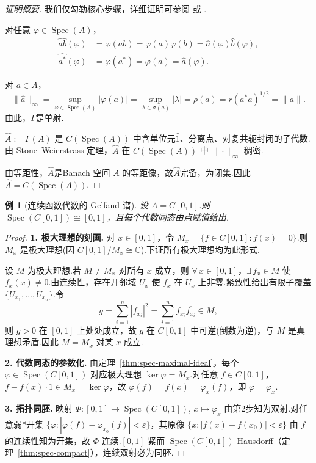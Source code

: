 \documentclass{ctexart}
\newtheorem{example}{例}[section]
\theoremstyle{plain}
\newtheorem*{proof}{证明}
\theoremstyle{plain}
\DeclareMathOperator{\Spec}{Spec}
\begin{document}
\begin{proof}[证明概要]
    我们仅勾勒核心步骤，详细证明可参阅 \cite{Murphy} 或 \cite{Davidson}.\par
     对任意 $\varphi \in \Spec(A)$，
    \begin{align}
        \widehat{ab}(\varphi) &= \varphi(ab) = \varphi(a)\varphi(b) = \widehat{a}(\varphi)\widehat{b}(\varphi), \\
        \widehat{a^*}(\varphi) &= \varphi(a^*) = \overline{\varphi(a)} = \overline{\widehat{a}(\varphi)}.
    \end{align}

     对 $a \in A$，
    \begin{equation}
        \|\widehat{a}\|_\infty = \sup_{\varphi \in \Spec(A)} |\varphi(a)| = \sup_{\lambda \in \sigma(a)} |\lambda| = \rho(a)= r(a^*a)^{1/2} = \|a\|.
    \end{equation}
    由此，$\Gamma$是单射.\par
     $\widehat{A}:=\Gamma(A)$ 是 $C(\Spec(A))$ 中含单位元$\hat{1}$、分离点、对复共轭封闭的子代数.由 Stone--Weierstrass 定理，$\widehat{A}$ 在 $C(\Spec(A))$ 中 $\|\cdot\|_\infty$-稠密.\par
    由等距性，$\widehat{A}$是Banach 空间 $A$ 的等距像，故$\widehat{A}$完备，为闭集.因此 $\widehat{A} = C(\Spec(A))$.
\end{proof}


\begin{example}[连续函数代数的 Gelfand 谱]\label{ex:C01}
    设 $A = C[0,1]$.则 $\Spec(C[0,1]) \cong [0,1]$，且每个代数同态由点赋值给出.
\end{example}

\begin{proof}
    \textbf{1. 极大理想的刻画.} 对 $x \in [0,1]$，令 $M_x = \{f \in C[0,1] : f(x) = 0\}$.则 $M_x$ 是极大理想(因 $C[0,1]/M_x \cong \mathbb{C}$).下证所有极大理想均为此形式.

    设 $M$ 为极大理想.若 $M \neq M_x$ 对所有 $x$ 成立，则 $\forall\,x \in [0,1]$，$\exists\,f_x \in M$ 使 $f_x(x) \neq 0$.由连续性，存在开邻域 $U_x$ 使 $f_x$ 在 $U_x$ 上非零.紧致性给出有限子覆盖 $\{U_{x_1},\dots,U_{x_n}\}$.令
    \[
        g = \sum_{i=1}^n |f_{x_i}|^2 = \sum_{i=1}^n f_{x_i}\overline{f_{x_i}} \in M,
    \]
    则 $g > 0$ 在 $[0,1]$ 上处处成立，故 $g$ 在 $C[0,1]$ 中可逆(倒数为逆)，与 $M$ 是真理想矛盾.因此 $M = M_x$ 对某 $x$ 成立.

    \textbf{2. 代数同态的参数化.} 由定理~\ref{thm:spec-maximal-ideal}，每个 $\varphi \in \Spec(C[0,1])$ 对应极大理想 $\ker\varphi = M_x$.对任意 $f \in C[0,1]$，$f - f(x)\cdot 1 \in M_x = \ker\varphi$，故 $\varphi(f) = f(x) = \varphi_x(f)$，即 $\varphi = \varphi_x$.

    \textbf{3. 拓扑同胚.} 映射 $\Phi: [0,1] \to \Spec(C[0,1])$, $x \mapsto \varphi_x$ 由第2步知为双射.对任意弱*开集 $\{\varphi : |\varphi(f) - \varphi_{x_0}(f)| < \varepsilon\}$，其原像 $\{x : |f(x) - f(x_0)| < \varepsilon\}$ 由 $f$ 的连续性知为开集，故 $\Phi$ 连续.$[0,1]$ 紧而 $\Spec(C[0,1])$ Hausdorff（定理~\ref{thm:spec-compact}），连续双射必为同胚.
\end{proof}
\end{document}
